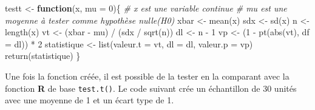 \documentclass[
]{book}
\newenvironment{Shaded}{}{}
\newcommand{\AttributeTok}[1]{#1}
\newcommand{\CommentTok}[1]{\textit{#1}}
\newcommand{\ControlFlowTok}[1]{\textbf{#1}}
\newcommand{\DecValTok}[1]{#1}
\newcommand{\FunctionTok}[1]{#1}
\newcommand{\NormalTok}[1]{#1}
\newcommand{\OtherTok}[1]{#1}
\newcommand{\SpecialCharTok}[1]{#1}
\begin{document}
\begin{Shaded}
\begin{Highlighting}[]
\NormalTok{testt }\OtherTok{\textless{}{-}} \ControlFlowTok{function}\NormalTok{(x, }\AttributeTok{mu =} \DecValTok{0}\NormalTok{)\{}
  \CommentTok{\# x est une variable continue}
  \CommentTok{\# mu est une moyenne à tester comme hypothèse nulle(H0)}
\NormalTok{  xbar }\OtherTok{\textless{}{-}} \FunctionTok{mean}\NormalTok{(x)}
\NormalTok{  sdx }\OtherTok{\textless{}{-}} \FunctionTok{sd}\NormalTok{(x)}
\NormalTok{  n }\OtherTok{\textless{}{-}} \FunctionTok{length}\NormalTok{(x)}
\NormalTok{  vt }\OtherTok{\textless{}{-}}\NormalTok{ (xbar }\SpecialCharTok{{-}}\NormalTok{ mu) }\SpecialCharTok{/}\NormalTok{ (sdx }\SpecialCharTok{/} \FunctionTok{sqrt}\NormalTok{(n))}
\NormalTok{  dl }\OtherTok{\textless{}{-}}\NormalTok{ n }\SpecialCharTok{{-}} \DecValTok{1}
\NormalTok{  vp }\OtherTok{\textless{}{-}}\NormalTok{ (}\DecValTok{1} \SpecialCharTok{{-}} \FunctionTok{pt}\NormalTok{(}\FunctionTok{abs}\NormalTok{(vt), }\AttributeTok{df =}\NormalTok{ dl)) }\SpecialCharTok{*} \DecValTok{2} 
\NormalTok{  statistique }\OtherTok{\textless{}{-}} \FunctionTok{list}\NormalTok{(}\AttributeTok{valeur.t =}\NormalTok{ vt, }
                      \AttributeTok{dl =}\NormalTok{ dl, }
                      \AttributeTok{valeur.p =}\NormalTok{ vp)}
  \FunctionTok{return}\NormalTok{(statistique)}
\NormalTok{\}}
\end{Highlighting}
\end{Shaded}

Une fois la fonction créée, il est possible de la tester en la comparant avec la fonction \textbf{R} de base \texttt{test.t()}. Le code suivant crée un échantillon de 30 unités avec une moyenne de 1 et un écart type de 1.
\end{document}
